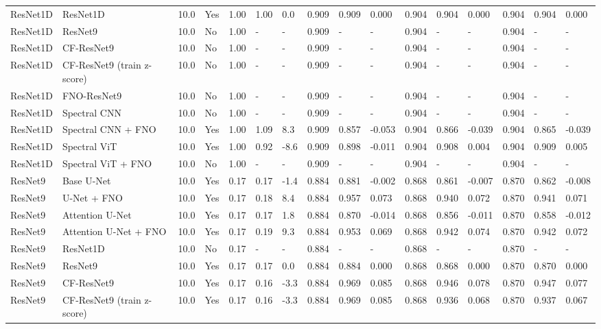 \begin{longtable}{llllllllllllllll}
ResNet1D & ResNet1D & 10.0 & Yes & 1.00 & 1.00 & 0.0 & 0.909 & 0.909 & 0.000 & 0.904 & 0.904 & 0.000 & 0.904 & 0.904 & 0.000 \\
ResNet1D & ResNet9 & 10.0 & No & 1.00 & - & - & 0.909 & - & - & 0.904 & - & - & 0.904 & - & - \\
ResNet1D & CF-ResNet9 & 10.0 & No & 1.00 & - & - & 0.909 & - & - & 0.904 & - & - & 0.904 & - & - \\
ResNet1D & CF-ResNet9 (train z-score) & 10.0 & No & 1.00 & - & - & 0.909 & - & - & 0.904 & - & - & 0.904 & - & - \\
ResNet1D & FNO-ResNet9 & 10.0 & No & 1.00 & - & - & 0.909 & - & - & 0.904 & - & - & 0.904 & - & - \\
ResNet1D & Spectral CNN & 10.0 & No & 1.00 & - & - & 0.909 & - & - & 0.904 & - & - & 0.904 & - & - \\
ResNet1D & Spectral CNN + FNO & 10.0 & Yes & 1.00 & 1.09 & 8.3 & 0.909 & 0.857 & -0.053 & 0.904 & 0.866 & -0.039 & 0.904 & 0.865 & -0.039 \\
ResNet1D & Spectral ViT & 10.0 & Yes & 1.00 & 0.92 & -8.6 & 0.909 & 0.898 & -0.011 & 0.904 & 0.908 & 0.004 & 0.904 & 0.909 & 0.005 \\
ResNet1D & Spectral ViT + FNO & 10.0 & No & 1.00 & - & - & 0.909 & - & - & 0.904 & - & - & 0.904 & - & - \\
ResNet9 & Base U-Net & 10.0 & Yes & 0.17 & 0.17 & -1.4 & 0.884 & 0.881 & -0.002 & 0.868 & 0.861 & -0.007 & 0.870 & 0.862 & -0.008 \\
ResNet9 & U-Net + FNO & 10.0 & Yes & 0.17 & 0.18 & 8.4 & 0.884 & 0.957 & 0.073 & 0.868 & 0.940 & 0.072 & 0.870 & 0.941 & 0.071 \\
ResNet9 & Attention U-Net & 10.0 & Yes & 0.17 & 0.17 & 1.8 & 0.884 & 0.870 & -0.014 & 0.868 & 0.856 & -0.011 & 0.870 & 0.858 & -0.012 \\
ResNet9 & Attention U-Net + FNO & 10.0 & Yes & 0.17 & 0.19 & 9.3 & 0.884 & 0.953 & 0.069 & 0.868 & 0.942 & 0.074 & 0.870 & 0.942 & 0.072 \\
ResNet9 & ResNet1D & 10.0 & No & 0.17 & - & - & 0.884 & - & - & 0.868 & - & - & 0.870 & - & - \\
ResNet9 & ResNet9 & 10.0 & Yes & 0.17 & 0.17 & 0.0 & 0.884 & 0.884 & 0.000 & 0.868 & 0.868 & 0.000 & 0.870 & 0.870 & 0.000 \\
ResNet9 & CF-ResNet9 & 10.0 & Yes & 0.17 & 0.16 & -3.3 & 0.884 & 0.969 & 0.085 & 0.868 & 0.946 & 0.078 & 0.870 & 0.947 & 0.077 \\
ResNet9 & CF-ResNet9 (train z-score) & 10.0 & Yes & 0.17 & 0.16 & -3.3 & 0.884 & 0.969 & 0.085 & 0.868 & 0.936 & 0.068 & 0.870 & 0.937 & 0.067 \\

\end{longtable}

